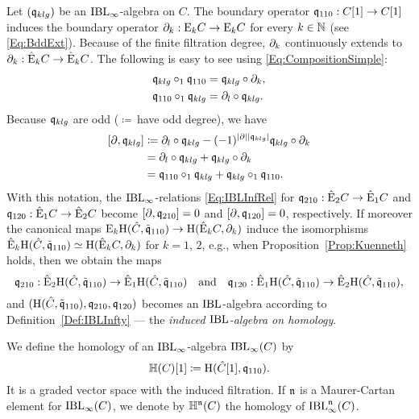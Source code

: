 \documentclass[\MainFolder/Text.tex]{subfiles}
\begin{document}
Let $(\mathfrak{q}_{klg})$ be an $\mathrm{IBL}_\infty$-algebra on $C$. The boundary operator $\mathfrak{q}_{110}: C[1] \rightarrow C[1]$ induces the boundary operator $\partial_k : \mathrm{E}_k C \rightarrow \mathrm{E}_k C$ for every $k\in \mathbb{N}$ (see \eqref{Eq:BddExt}). Because of the finite filtration degree, $\partial_k$ continuously extends to $\partial_k: \hat{\mathrm{E}}_k C \rightarrow \hat{\mathrm{E}}_k C$.
The following is easy to see using \eqref{Eq:CompositionSimple}:
$$\begin{aligned}
 \mathfrak{q}_{klg} \circ_1 \mathfrak{q}_{110} &= \mathfrak{q}_{klg} \circ \partial_k, \\
 \mathfrak{q}_{110} \circ_1 \mathfrak{q}_{klg} &= \partial_l \circ \mathfrak{q}_{klg}.
\end{aligned}$$
Because $\mathfrak{q}_{klg}$ are odd ($\coloneqq$\,have odd degree), we have
$$ \begin{aligned}
  [\Bdd,\OPQ_{klg}] &\coloneqq \Bdd_l \circ \OPQ_{klg} - (-1)^{\Abs{\Bdd}\Abs{\OPQ_{klg}}} \OPQ_{klg}\circ \Bdd_k \\
   &= \Bdd_l \circ \OPQ_{klg} + \OPQ_{klg}\circ \Bdd_k \\
   &= \OPQ_{110}\circ_1 \OPQ_{klg} + \OPQ_{klg}\circ_1 \OPQ_{110}.
  \end{aligned}$$
With this notation, the $\mathrm{IBL}_\infty$-relations \eqref{Eq:IBLInfRel} for 
$\mathfrak{q}_{210}: \hat{\mathrm{E}}_2 C \rightarrow \hat{\mathrm{E}}_1 C$ and $\mathfrak{q}_{120}: \hat{\mathrm{E}}_1 C \rightarrow \hat{\mathrm{E}}_2 C$ become $[\partial,\mathfrak{q}_{210}] = 0$ and $[\partial,\mathfrak{q}_{120}] = 0$, respectively. If moreover the canonical maps $\mathrm{E}_k \mathrm{H}(\hat{C},\tilde{\mathfrak{q}}_{110}) \rightarrow \mathrm{H}(\hat{\mathrm{E}}_k C, \partial_k)$ induce the isomorphisms $\hat{\mathrm{E}}_k \mathrm{H}(\hat{C},\tilde{\mathfrak{q}}_{110})  \simeq \mathrm{H}(\hat{\mathrm{E}}_k C, \partial_k)$ for $k=1$, $2$, e.g., when Proposition~\ref{Prop:Kuenneth} holds, then we obtain the maps
$$ \mathfrak{q}_{210}: \hat{\mathrm{E}}_2\mathrm{H}(\hat{C},\tilde{\mathfrak{q}}_{110})  \rightarrow \hat{\mathrm{E}}_1\mathrm{H}(\hat{C},\tilde{\mathfrak{q}}_{110}) \quad \text{and}\quad \mathfrak{q}_{120}: \hat{\mathrm{E}}_1\mathrm{H}(\hat{C},\tilde{\mathfrak{q}}_{110})  \rightarrow \hat{\mathrm{E}}_2\mathrm{H}(\hat{C},\tilde{\mathfrak{q}}_{110}), $$
and $(\mathrm{H}(\hat{C},\tilde{\mathfrak{q}}_{110}),\mathfrak{q}_{210},\mathfrak{q}_{120})$ becomes an $\mathrm{IBL}$-algebra according to Definition~\ref{Def:IBLInfty} --- the \emph{induced $\mathrm{IBL}$-algebra on homology}.

\begin{Definition}[Homology]\label{Def:HomIBL}
We define the homology of an $\mathrm{IBL}_\infty$-algebra $\mathrm{IBL}_\infty(C)$ by
$$ \mathbb{H}(C)[1] \coloneqq \mathrm{H}(\hat{C}[1], \mathfrak{q}_{110}). $$
It is a graded vector space with the induced filtration. If $\mathfrak{n}$ is a Maurer-Cartan element for $\mathrm{IBL}_\infty(C)$, we denote by $\mathbb{H}^{\mathfrak{n}}(C)$ the homology of $\mathrm{IBL}_\infty^{\mathfrak{n}}(C)$.
\end{Definition}
\end{document}
